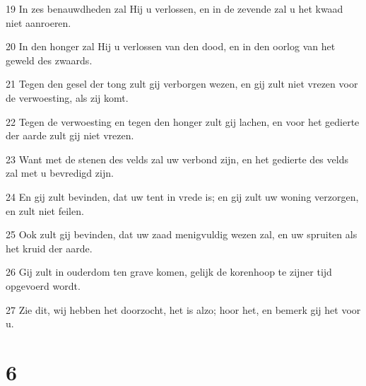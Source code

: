 \par 19 In zes benauwdheden zal Hij u verlossen, en in de zevende zal u het kwaad niet aanroeren.
\par 20 In den honger zal Hij u verlossen van den dood, en in den oorlog van het geweld des zwaards.
\par 21 Tegen den gesel der tong zult gij verborgen wezen, en gij zult niet vrezen voor de verwoesting, als zij komt.
\par 22 Tegen de verwoesting en tegen den honger zult gij lachen, en voor het gedierte der aarde zult gij niet vrezen.
\par 23 Want met de stenen des velds zal uw verbond zijn, en het gedierte des velds zal met u bevredigd zijn.
\par 24 En gij zult bevinden, dat uw tent in vrede is; en gij zult uw woning verzorgen, en zult niet feilen.
\par 25 Ook zult gij bevinden, dat uw zaad menigvuldig wezen zal, en uw spruiten als het kruid der aarde.
\par 26 Gij zult in ouderdom ten grave komen, gelijk de korenhoop te zijner tijd opgevoerd wordt.
\par 27 Zie dit, wij hebben het doorzocht, het is alzo; hoor het, en bemerk gij het voor u.

\chapter{6}

